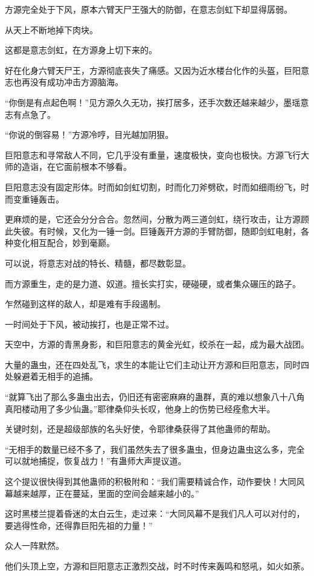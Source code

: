 \begin{this_body}
方源完全处于下风，原本六臂天尸王强大的防御，在意志剑虹下却显得孱弱。

从天上不断地掉下肉块。

这都是意志剑虹，在方源身上切下来的。

好在化身六臂天尸王，方源彻底丧失了痛感。又因为近水楼台化作的头盔，巨阳意志也再没有成功冲击方源脑海。

“你倒是有点起色啊！”见方源久久无功，挨打居多，还手次数还越来越少，墨瑶意志有点急了。

“你说的倒容易！”方源冷哼，目光越加阴狠。

巨阳意志和寻常敌人不同，它几乎没有重量，速度极快，变向也极快。方源飞行大师的造诣，在它面前根本不够看。

巨阳意志没有固定形体。时而如剑虹切割，时而化刀斧劈砍，时而如细雨纷飞，时而变重锤轰击。

更麻烦的是，它还会分分合合。忽然间，分散为两三道剑虹，绕行攻击，让方源顾此失彼。有时候，又化为一锤一剑。巨锤轰开方源的手臂防御，随即剑虹电射，各种变化相互配合，妙到毫巅。

可以说，将意志对战的特长、精髓，都尽数彰显。

而方源重生，走的是力道、奴道。擅长实打实，硬碰硬，或者集众碾压的路子。

乍然碰到这样的敌人，却是难有手段遏制。

一时间处于下风，被动挨打，也是正常不过。

天空中，方源的青黑身影，和巨阳意志的黄金光虹，绞杀在一起，成为最大战团。

大量的蛊虫，还在四处乱飞，求生的本能让它们主动让开方源和巨阳意志，同时四处躲避着无相手的追捕。

“就算飞出了那么多蛊虫出去，仍旧还有密密麻麻的蛊群，真的难以想象八十八角真阳楼动用了多少仙蛊。”耶律桑仰头长叹，他身上的伤势已经痊愈大半。

关键时刻，还是超级部族的名头好使，令耶律桑获得了其他蛊师的帮助。

“无相手的数量已经不多了，我们虽然失去了很多蛊虫，但身边蛊虫这么多，完全可以就地捕捉，恢复战力！”有蛊师大声提议道。

这个提议很快得到其他蛊师的积极附和：“我们需要精诚合作，动作要快！大同风幕越来越厚，正在蔓延，里面的空间会越来越小的。”

这时黑楼兰提着昏迷的太白云生，走过来：“大同风幕不是我们凡人可以对付的，要逃得性命，还得靠巨阳先祖的力量！”

众人一阵默然。

他们头顶上空，方源和巨阳意志正激烈交战，时不时传来轰鸣和怒吼，如火如荼。


\end{this_body}

